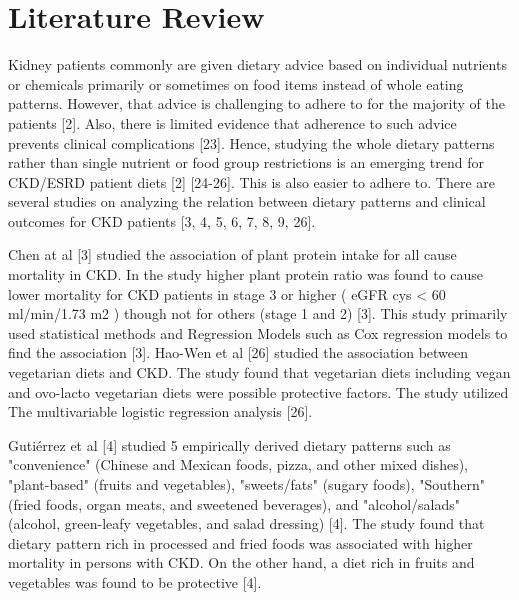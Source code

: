 \section{Literature Review}

\medskip
Kidney patients commonly are given dietary advice based on individual nutrients or chemicals primarily or sometimes on food items instead of whole eating patterns. However, that advice is challenging to adhere to for the majority of the patients [2].
Also, there is limited evidence that adherence to such advice prevents clinical complications [23]. Hence, studying the whole dietary patterns rather than single nutrient or food group restrictions is an emerging trend for CKD/ESRD patient diets [2] [24-26]. This is also easier to adhere to. There are several studies on analyzing the relation between dietary patterns and clinical outcomes for CKD patients [3, 4, 5, 6, 7, 8, 9, 26].

\medskip
\noindent Chen at al [3] studied the association of plant protein intake for all cause mortality in CKD. In the study higher plant protein ratio was found to cause lower mortality for CKD patients in stage 3 or higher ( eGFR cys < 60 ml/min/1.73 m2 ) though not for others (stage 1 and 2) [3]. This study primarily used statistical methods and Regression Models such as Cox regression models to find the association [3]. Hao-Wen et al [26] studied the association between vegetarian diets and CKD. The study found that vegetarian diets including vegan and ovo-lacto vegetarian diets were possible protective factors. The study utilized The multivariable logistic regression analysis [26].

\medskip
\noindent Gutiérrez et al [4] studied 5 empirically derived dietary patterns such as "convenience" (Chinese and Mexican foods, pizza, and other mixed dishes), "plant-based" (fruits and vegetables), "sweets/fats" (sugary foods), "Southern" (fried foods, organ meats, and sweetened beverages), and "alcohol/salads" (alcohol, green-leafy vegetables, and salad dressing) [4]. The study found that dietary pattern rich in processed and fried foods was associated with higher mortality in persons with CKD. On the other hand, a diet rich in fruits and
vegetables was found to be protective [4].

